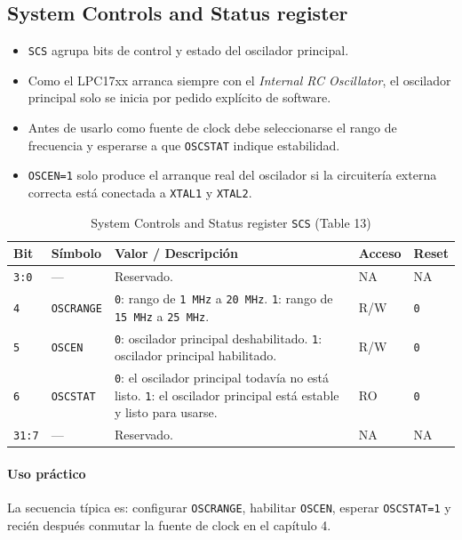\subsection{System Controls and Status register}
\begin{itemize}
  \item \texttt{SCS} agrupa bits de control y estado del oscilador principal.
  \item Como el LPC17xx arranca siempre con el \textit{Internal RC Oscillator}, el oscilador principal solo se inicia por pedido expl\'icito de software.
  \item Antes de usarlo como fuente de clock debe seleccionarse el rango de frecuencia y esperarse a que \texttt{OSCSTAT} indique estabilidad.
  \item \texttt{OSCEN=1} solo produce el arranque real del oscilador si la circuiter\'ia externa correcta est\'a conectada a \texttt{XTAL1} y \texttt{XTAL2}.
\end{itemize}

\begin{table}[H]
  \centering
  \small
  \renewcommand{\arraystretch}{1.15}
  \caption{System Controls and Status register \texttt{SCS} (Table 13)}
  \begin{tabularx}{0.96\textwidth}{|>{\centering\arraybackslash}p{}|>{\raggedright\arraybackslash}p{}|>{\raggedright\arraybackslash}X|>{\centering\arraybackslash}p{}|>{\centering\arraybackslash}p{}|}
    \hline
    \textbf{Bit} & \textbf{S\'imbolo} & \textbf{Valor / Descripci\'on} & \textbf{Acceso} & \textbf{Reset} \\
    \hline
    \texttt{3:0} & --- & Reservado. & NA & NA \\
    \hline
    \texttt{4} & \texttt{OSCRANGE} & \texttt{0}: rango de \texttt{1 MHz} a \texttt{20 MHz}. \texttt{1}: rango de \texttt{15 MHz} a \texttt{25 MHz}. & R/W & \texttt{0} \\
    \hline
    \texttt{5} & \texttt{OSCEN} & \texttt{0}: oscilador principal deshabilitado. \texttt{1}: oscilador principal habilitado. & R/W & \texttt{0} \\
    \hline
    \texttt{6} & \texttt{OSCSTAT} & \texttt{0}: el oscilador principal todav\'ia no est\'a listo. \texttt{1}: el oscilador principal est\'a estable y listo para usarse. & RO & \texttt{0} \\
    \hline
    \texttt{31:7} & --- & Reservado. & NA & NA \\
    \hline
  \end{tabularx}
\end{table}

\paragraph{Uso pr\'actico}
La secuencia t\'ipica es: configurar \texttt{OSCRANGE}, habilitar \texttt{OSCEN}, esperar \texttt{OSCSTAT=1} y reci\'en despu\'es conmutar la fuente de clock en el cap\'itulo 4.
